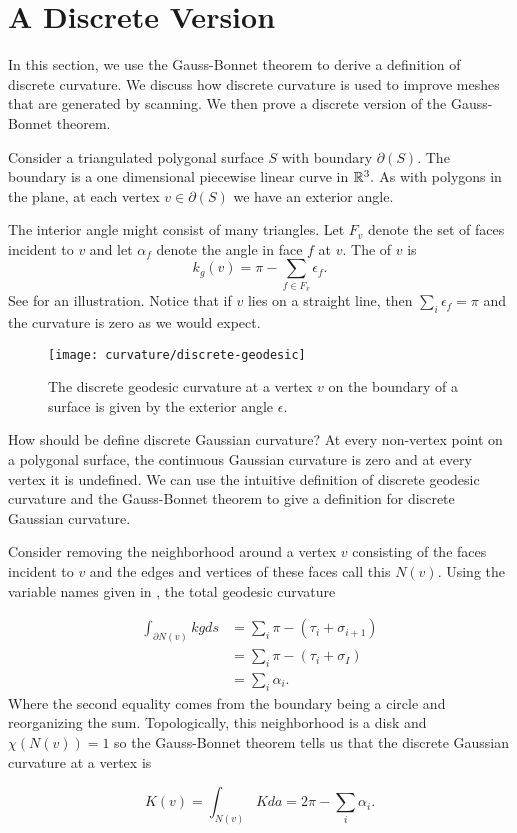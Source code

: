 \section{A Discrete Version}
\label{sec:discrete}

In this section, we use the Gauss-Bonnet theorem to derive
a definition of discrete curvature. We discuss how discrete curvature
is used to improve meshes that are generated by scanning.
We then prove a discrete version of the Gauss-Bonnet theorem.

Consider a triangulated polygonal surface $S$ with boundary $\partial(S)$.
The boundary is a one dimensional piecewise linear curve in $\mathbb{R}^3.$
As with polygons in the plane, at each vertex $v\in \partial(S)$ 
we have an exterior angle.

The interior angle might consist of many triangles.
Let $F_v$  denote the set of faces incident to $v$ and let
$\alpha_f$ denote the angle in face $f$ at $v$.
The 
of $v$  is
$$k_{g}(v)= \pi-\sum_{f\in F_v}\epsilon_f.$$
See  for an illustration.
Notice that if $v$ lies on a straight line, then $\sum_{i}\epsilon_f=\pi$
and the curvature is zero as we would expect.


\begin{figure}[htb]
\centering
	\texttt{[image: curvature/discrete-geodesic]}
	\caption{The discrete geodesic curvature at a vertex $v$ on the boundary
	of a surface is given by the exterior angle $\epsilon$.}
	\label{fig:discrete-geodesic}
\end{figure}

How should be define discrete Gaussian curvature?
At every non-vertex point on a polygonal surface, the continuous Gaussian curvature
is zero and at every vertex it is undefined.
We can use the intuitive definition of discrete geodesic curvature and the Gauss-Bonnet
theorem to give a definition for discrete Gaussian curvature.

Consider removing the neighborhood around a vertex $v$ consisting
of the faces incident to $v$ and the edges and vertices of these faces call
this $N(v)$.
Using the variable names given in ,
the total geodesic curvature

\begin{align}
\int_{\partial N(v)} kg ds &=\sum_i \pi -(\tau_i+\sigma_{i+1})\nonumber  \\
       &=\sum_i \pi -(\tau_i+\sigma_{I}) \nonumber  \\
       &=\sum_i \alpha_i. \nonumber 
\end{align}
Where the second equality comes from the boundary being a circle and reorganizing the sum.
Topologically, this neighborhood is a disk and $\chi(N(v))=1$
so the Gauss-Bonnet theorem tells us that 
the discrete Gaussian curvature at a vertex is
\begin{definition}\label{def:discrete-curvature-vertex}

$$K(v)=\int_{N(v)}K da=2\pi-\sum_i \alpha_i.$$

\end{definition}

